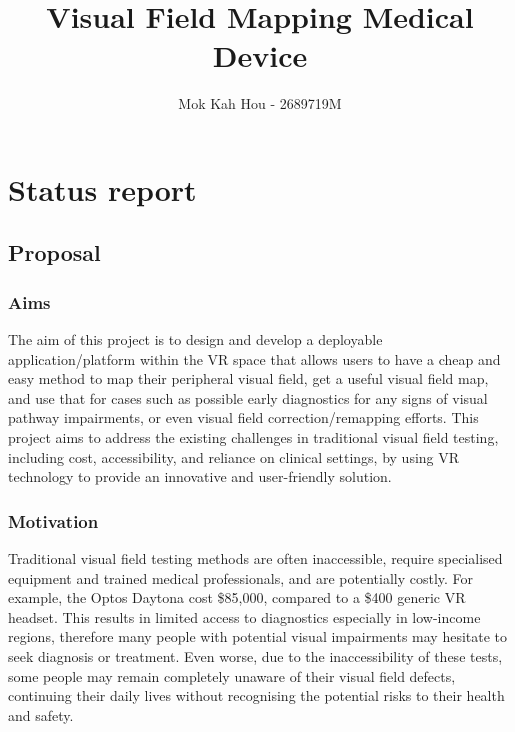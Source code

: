 \documentclass[11pt]{article}
\title{Visual Field Mapping Medical Device}
\author{Mok Kah Hou - 2689719M}
\begin{document}
    \maketitle
    
    
     

\section{Status report}

\subsection{Proposal}\label{proposal}

\subsubsection{Aims}\label{aims}


The aim of this project is to design and develop a deployable application/platform within the VR space that allows users to have a cheap and easy method to map their peripheral visual field, get a useful visual field map, and use that for cases such as possible early diagnostics for any signs of visual pathway impairments, or even visual field correction/remapping efforts. This project aims to address the existing challenges in traditional visual field testing, including cost, accessibility, and reliance on clinical settings, by using VR technology to provide an innovative and user-friendly solution.

\subsubsection{Motivation}\label{motivation}


Traditional visual field testing methods are often inaccessible, require specialised equipment and trained medical professionals, and are potentially costly. For example, the Optos Daytona cost \$85,000, compared to a \$400 generic VR headset. This results in limited access to diagnostics especially in low-income regions, therefore many people with potential visual impairments may hesitate to seek diagnosis or treatment. Even worse, due to the inaccessibility of these tests, some people may remain completely unaware of their visual field defects, continuing their daily lives without recognising the potential risks to their health and safety.
\end{document}

